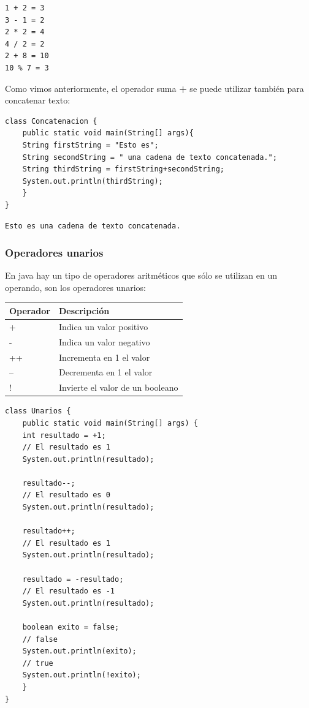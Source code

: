 \documentclass[11pt]{article}
\begin{document}
\begin{verbatim}
1 + 2 = 3
3 - 1 = 2
2 * 2 = 4
4 / 2 = 2
2 + 8 = 10
10 % 7 = 3
\end{verbatim}

Como vimos anteriormente, el operador suma \textbf{+} se puede utilizar también para concatenar texto:

\begin{verbatim}
class Concatenacion {
    public static void main(String[] args){
	String firstString = "Esto es";
	String secondString = " una cadena de texto concatenada.";
	String thirdString = firstString+secondString;
	System.out.println(thirdString);
    }
}
\end{verbatim}

\begin{verbatim}
Esto es una cadena de texto concatenada.
\end{verbatim}


\subsubsection{Operadores unarios}
\label{sec:org6f2706a}
En java hay un tipo de operadores aritméticos que sólo se utilizan en un operando, son los operadores unarios:
\begin{center}
\begin{tabular}{ll}
Operador & Descripción\\
\hline
+ & Indica un valor positivo\\
- & Indica un valor negativo\\
++ & Incrementa en 1 el valor\\
-- & Decrementa en 1 el valor\\
! & Invierte el valor de un booleano\\
\end{tabular}
\end{center}

\begin{verbatim}
class Unarios {
    public static void main(String[] args) {
	int resultado = +1;
	// El resultado es 1
	System.out.println(resultado);

	resultado--;
	// El resultado es 0
	System.out.println(resultado);

	resultado++;
	// El resultado es 1
	System.out.println(resultado);

	resultado = -resultado;
	// El resultado es -1
	System.out.println(resultado);

	boolean exito = false;
	// false
	System.out.println(exito);
	// true
	System.out.println(!exito);
    }
}
\end{verbatim}
\end{document}
